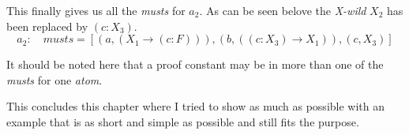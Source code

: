 This finally gives us all the \emph{musts} for $a_2$. As can be seen belove the \emph{X-wild} $X_2$ has been replaced by $(c:X_3)$.
\begin{equation}\label{eq:a2_musts}
	a_2: \quad musts = [(a, (X_1 \rightarrow (c:F))), (b, ((c:X_3) \rightarrow X_1)), (c, X_3)]
\end{equation}

It should be noted here that a proof constant may be in more than one of the \emph{musts} for one \emph{atom}. 


This concludes this chapter where I tried to show as much as possible with an example that is as short and simple as possible and still fits the purpose. 
